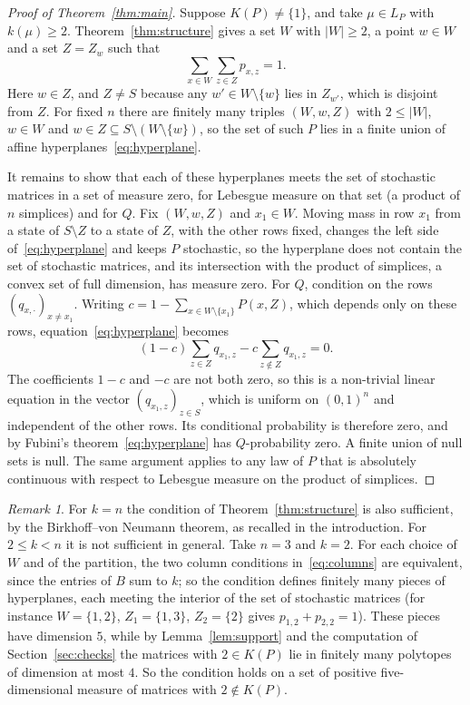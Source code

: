\documentclass[11pt]{amsart}
\theoremstyle{remark}
\newtheorem{remark}[theorem]{Remark}
\begin{document}
\begin{proof}[Proof of Theorem~\ref{thm:main}]
Suppose $K(P)\ne\{1\}$, and take $\mu\in L_P$ with $k(\mu)\ge2$. Theorem~\ref{thm:structure} gives a set $W$ with
$|W|\ge2$, a point $w\in W$ and a set $Z=Z_w$ such that
\begin{equation}\label{eq:hyperplane}
\sum_{x\in W}\sum_{z\in Z}p_{x,z}=1 .
\end{equation}
Here $w\in Z$, and $Z\ne S$ because any $w'\in W\setminus\{w\}$ lies in $Z_{w'}$, which is disjoint from $Z$. For fixed $n$
there are finitely many triples $(W,w,Z)$ with $2\le|W|$, $w\in W$ and $w\in Z\subseteq S\setminus(W\setminus\{w\})$, so
the set of such $P$ lies in a finite union of affine hyperplanes~\eqref{eq:hyperplane}.

It remains to show that each of these hyperplanes meets the set of stochastic matrices in a set of measure zero, for
Lebesgue measure on that set (a product of $n$ simplices) and for $Q$. Fix $(W,w,Z)$ and $x_1\in W$. Moving mass in row
$x_1$ from a state of $S\setminus Z$ to a state of $Z$, with the other rows fixed, changes the left side
of~\eqref{eq:hyperplane} and keeps $P$ stochastic, so the hyperplane does not contain the set of stochastic matrices, and
its intersection with the product of simplices, a convex set of full dimension, has measure zero. For $Q$, condition on
the rows $(q_{x,\cdot})_{x\ne x_1}$. Writing $c=1-\sum_{x\in W\setminus\{x_1\}}P(x,Z)$, which depends only on these rows,
equation~\eqref{eq:hyperplane} becomes
\[
(1-c)\sum_{z\in Z}q_{x_1,z}-c\sum_{z\notin Z}q_{x_1,z}=0 .
\]
The coefficients $1-c$ and $-c$ are not both zero, so this is a non-trivial linear equation in the vector
$(q_{x_1,z})_{z\in S}$, which is uniform on $(0,1)^n$ and independent of the other rows. Its conditional probability is
therefore zero, and by Fubini's theorem~\eqref{eq:hyperplane} has $Q$-probability zero. A finite union of null sets is
null. The same argument applies to any law of $P$ that is absolutely continuous with respect to Lebesgue measure on the
product of simplices.
\end{proof}

\begin{remark}\label{rem:necessary}
For $k=n$ the condition of Theorem~\ref{thm:structure} is also sufficient, by the Birkhoff--von Neumann theorem, as
recalled in the introduction. For $2\le k<n$ it is not sufficient in general. Take $n=3$ and $k=2$. For each choice of
$W$ and of the partition, the two column conditions in~\eqref{eq:columns} are equivalent, since the entries of $B$ sum
to $k$; so the condition defines finitely many pieces of hyperplanes, each meeting the interior of the set of stochastic
matrices (for instance $W=\{1,2\}$, $Z_1=\{1,3\}$, $Z_2=\{2\}$ gives $p_{1,2}+p_{2,2}=1$). These pieces have dimension $5$,
while by Lemma~\ref{lem:support} and the computation of Section~\ref{sec:checks} the matrices with $2\in K(P)$ lie in
finitely many polytopes of dimension at most $4$. So the condition holds on a set of positive five-dimensional measure
of matrices with $2\notin K(P)$.
\end{remark}
\end{document}
